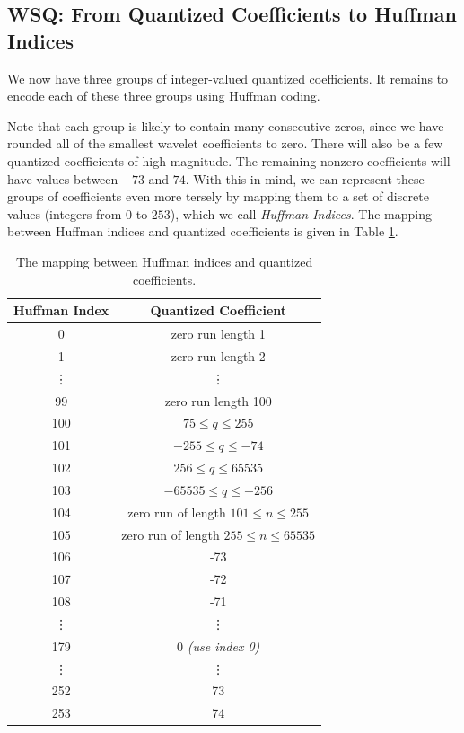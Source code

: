 \subsection*{WSQ: From Quantized Coefficients to Huffman Indices}
We now have three groups of integer-valued quantized coefficients.
It remains to encode each of these three groups using Huffman coding.

Note that each group is likely to contain many consecutive zeros, since we have rounded all of the smallest
wavelet coefficients to zero.
There will also be a few quantized coefficients of high magnitude.
The remaining nonzero coefficients will have values between $-73$ and $74$.
With this in mind, we can represent these groups of coefficients even more tersely by
mapping them to a set of discrete values (integers from $0$ to $253$), which we call \emph{Huffman Indices}.
The mapping between Huffman indices and quantized coefficients is given in Table \ref{table:huffIndex}.
\begin{table}
\begin{tabular}{|c|c|}
\hline
\textbf{Huffman Index} & \textbf{Quantized Coefficient}\\\hline
0 & zero run length 1\\\hline
1 & zero run length 2\\\hline
\vdots & \vdots\\\hline
99 & zero run length 100\\\hline
100 & $75\leq q \leq 255$\\\hline
101 & $-255 \leq q \leq -74$\\\hline
102 & $256 \leq q \leq 65535$\\\hline
103 & $-65535 \leq q \leq -256$\\\hline
104 & zero run of length $101\leq n \leq 255$\\\hline
105 & zero run of length $255\leq n \leq 65535$\\\hline
106 & -73\\\hline
107 & -72\\\hline
108 & -71\\\hline
\vdots & \vdots\\\hline
179 & 0 \emph{(use index 0)}\\\hline
\vdots & \vdots \\\hline
252 & 73\\\hline
253 & 74\\\hline
\end{tabular}
\caption{The mapping between Huffman indices and quantized coefficients.}
\label{table:huffIndex}
\end{table}

